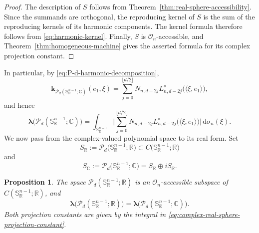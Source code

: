 \documentclass[11pt,showkeys]{amsart}
\newtheorem{proposition}[theorem]{Proposition}
\begin{document}
\begin{proof}
The description of $S$ follows from
Theorem~\ref{thm:real-sphere-accessibility}. Since the summands are
orthogonal, the reproducing kernel of $S$ is the sum of the reproducing
kernels of its harmonic components. The kernel formula therefore follows
from \eqref{eq:harmonic-kernel}. Finally, $S$ is $\mathcal O_n$-accessible,
and Theorem~\ref{thm:homogeneous-machine} gives the asserted formula for its complex projection
constant.
\end{proof}

In particular, by \eqref{eq:P-d-harmonic-decomposition},
\[
\mathbf k_{\mathcal P_d(\mathbb S_{\mathbb R}^{n-1};\mathbb C)}(e_1,\xi)
=
\sum_{j=0}^{\lfloor d/2\rfloor}
N_{n,d-2j}
L^\diamond_{n,d-2j}\bigl(\langle\xi,e_1\rangle\bigr),
\]
and hence
\begin{equation}
\label{eq:complex-real-sphere-projection-constant}
\boldsymbol \lambda\bigl(\mathcal P_d(\mathbb S_{\mathbb R}^{n-1};\mathbb C)\bigr)
=
\int_{\mathbb S_{\mathbb R}^{n-1}}
\bigg|
\sum_{j=0}^{\lfloor d/2\rfloor}
N_{n,d-2j}
L^\diamond_{n,d-2j}\bigl(\langle\xi,e_1\rangle\bigr)
\bigg|
\,\mathrm{d}\sigma_n(\xi).
\end{equation}
We now pass from the complex-valued polynomial space to its real form. Set
\[
S_{\mathbb R}
:=
\mathcal P_d\bigl(\mathbb S_{\mathbb R}^{n-1};\mathbb R\bigr)
\subset
C\bigl(\mathbb S_{\mathbb R}^{n-1};\mathbb R\bigr)
\]
and
\[
S_{\mathbb C}
:=
\mathcal P_d\bigl(\mathbb S_{\mathbb R}^{n-1};\mathbb C\bigr)
=
S_{\mathbb R}\oplus iS_{\mathbb R}.
\]

\begin{proposition}
\label{prop:real-complex-projection-constants}
The space
$\mathcal P_d(\mathbb S_{\mathbb R}^{n-1};\mathbb R)$ is an
$\mathcal O_n$-accessible subspace of
$C(\mathbb S_{\mathbb R}^{n-1};\mathbb R)$, and
\[
\boldsymbol \lambda\bigl(\mathcal P_d(\mathbb S_{\mathbb R}^{n-1};\mathbb R)\bigr)
=
\boldsymbol \lambda\bigl(\mathcal P_d(\mathbb S_{\mathbb R}^{n-1};\mathbb C)\bigr).
\]
Both projection constants are given by the integral in
\eqref{eq:complex-real-sphere-projection-constant}.
\end{proposition}
\end{document}

